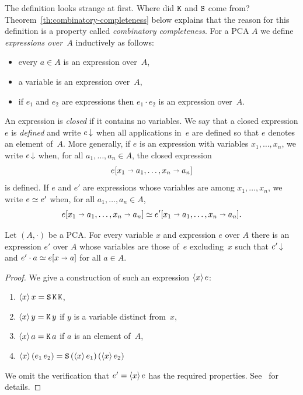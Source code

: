 \noindent
The definition looks strange at first. Where did $\mathtt{K}$ and $\mathtt{S}$
come from? Theorem~\ref{th:combinatory-completeness} below explains
that the reason for this definition is a property called
\emph{combinatory completeness}.
%
For a PCA $A$ we define \emph{expressions over~$A$} inductively as
follows:
%
\begin{itemize}
\item every $a \in A$ is an expression over~$A$,
\item a variable is an expression over~$A$,
\item if $e_1$ and $e_2$ are expressions then $e_1 \cdot e_2$ is an
  expression over~$A$.
\end{itemize}
%
An expression is \emph{closed} if it contains no variables. We say
that a closed expression $e$ is \emph{defined} and write $e\,{\downarrow}$
when all applications in~$e$ are defined so that $e$ denotes an
element of~$A$. More generally, if $e$ is an expression with variables
$x_1, \ldots, x_n$, we write $e\,{\downarrow}$ when, for all $a_1, \ldots,
a_n \in A$, the closed expression
%
\begin{equation*}
  e[x_1 \shortrightarrow a_1, \ldots, x_n \shortrightarrow a_n]
\end{equation*}
%
is defined. If $e$ and $e'$ are expressions whose variables are among
$x_1, \ldots, x_n$, we write $e \simeq e'$ when, for all $a_1, \ldots,
a_n \in A$,
%
\begin{equation*}
  e[x_1 \shortrightarrow a_1, \ldots, x_n \shortrightarrow a_n] \simeq
  e'[x_1 \shortrightarrow a_1, \ldots, x_n \shortrightarrow a_n].
\end{equation*}

\begin{theorem}
  \label{th:combinatory-completeness}
  Let $(A, {\cdot})$ be a PCA. For every variable $x$ and expression
  $e$ over $A$ there is an expression $e'$ over $A$ whose variables
  are those of~$e$ excluding~$x$ such that $e'\,{\downarrow}$ and $e'
  \cdot a \simeq e[x \shortrightarrow a]$ for all $a \in A$.
\end{theorem}

\begin{proof}
  We give a construction of such an expression $\langle x \rangle\,e$:
  \begin{enumerate}
  \item $\langle x \rangle\,x = \mathtt{S}\, \mathtt{K}\, \mathtt{K}$,
  \item $\langle x \rangle\,y = \mathtt{K}\, y$ if $y$ is a variable distinct from~$x$,
  \item $\langle x \rangle\,a = \mathtt{K}\, a$ if $a$ is an element of~$A$,
  \item $\langle x \rangle\,(e_1\, e_2) = \mathtt{S}\, (\langle x \rangle\,e_1)\, (\langle x \rangle\,e_2)$
  \end{enumerate}
  We omit the verification that $e' = \langle x \rangle\,e$ has the required
  properties. See~\cite{LongleyJ:reatls} for details.
\end{proof}

